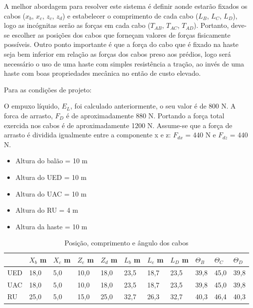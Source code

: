 A melhor abordagem para resolver este sistema é definir aonde estarão fixados os cabos ($x_{b}$, $x_{c}$, $z_{c}$, $z_{d}$) e estabelecer o comprimento de cada cabo ($L_{B}$, $L_{C}$, $L_{D}$), logo as incógnitas serão as forças em cada cabo ($T_{AB}$, $T_{AC}$, $T_{AD}$). Portanto, deve-se escolher as posições dos cabos que forneçam valores de forças fisicamente possíveis. Outro ponto importante é que a força do cabo que é fixado na haste seja bem inferior em relação as forças dos cabos preso aos prédios, logo será necessário o uso de uma haste com simples resistência a tração, ao invés de uma haste com boas propriedades mecânica no então de custo elevado.

	Para as condições de projeto:

	O empuxo líquido, $E_{L}$, foi calculado anteriormente, o seu valor é de 800 N. A forca de arrasto, $F_{D}$ é de aproximadamente 880 N. Portando a força total exercida nos cabos é de aproximadamente 1200 N. Assume-se que a força de arrasto é dividida igualmente entre a componente x e z: $F_{dx}$ = 440 N e $F_{dz}$ = 440 N.

	\begin{itemize}
		\item  Altura do balão = 10 m
 		\item Altura do UED = 10 m
 		\item Altura do UAC = 10 m
 		\item Altura do RU = 4 m
 		\item Altura da haste = 10 m
	\end{itemize}

\begin{table}[H]
\centering
\begin{tabular}{l|l|l|l|l|l|l|l|l|l|l|}
\cline{2-11}
 & $X_{b}$ m & $X_{c}$ m & $Z_{c}$ m & $Z_{d}$ m & $L_{b}$ m & $L_{c}$ m & $L_{D}$ m & $\Theta _{B}$ & $\Theta _{C}$ & $\Theta _{D}$ \\ \hline
\multicolumn{1}{|l|}{UED} & 18,0 & 5,0 & 10,0 & 18,0 & 23,5 & 18,7 & 23,5 & 39,8 & 45,0 & 39,8 \\ \hline
\multicolumn{1}{|l|}{UAC} & 18,0 & 5,0 & 10,0 & 18,0 & 23,5 & 18,7 & 23,5 & 39,8 & 45,0 & 39,8 \\ \hline
\multicolumn{1}{|l|}{RU} & 25,0 & 5,0 & 15,0 & 25,0 & 32,7 & 26,3 & 32,7 & 40,3 & 46,4 & 40,3 \\ \hline
\end{tabular}
\caption{Posição, comprimento e ângulo dos cabos}
\label{tab:composangcabos}
\end{table}

